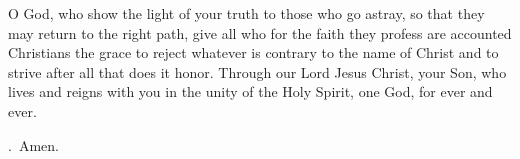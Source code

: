 \lettrine[lines=3]{O}{} God, who show the light of your truth
to those who go astray,
so that they may return to the right path,
give all who for the faith they profess
are accounted Christians
the grace to reject whatever is contrary to the name of Christ
and to strive after all that does it honor.
Through our Lord Jesus Christ, your Son,
who lives and reigns with you in the unity of the Holy Spirit,
one God, for ever and ever. \par \Rbar.~Amen.

